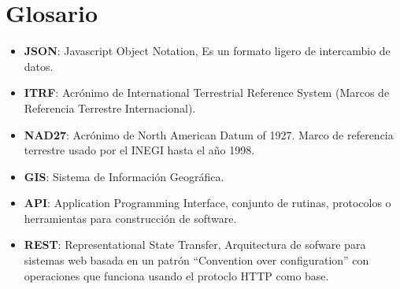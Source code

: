 \newpage
\section*{Glosario}
\begin{itemize}
	\item \textbf{JSON}: Javascript Object Notation, Es un formato ligero de intercambio de datos.
	\item \textbf{ITRF}: Acrónimo de International Terrestrial Reference System (Marcos de Referencia Terrestre Internacional).
	\item \textbf{NAD27}: Acrónimo de North American Datum of 1927. Marco de referencia terrestre usado por el INEGI hasta el año 1998.
	\item \textbf{GIS}: Sistema de Información Geográfica.
  \item \textbf{API}: Application Programming Interface, conjunto de rutinas, protocolos o herramientas para construcción de software.
  \item \textbf{REST}: Representational State Transfer, Arquitectura de sofware para sistemas web basada en un patrón ``Convention over configuration'' con operaciones que funciona usando el protoclo HTTP como base.
\end{itemize}
